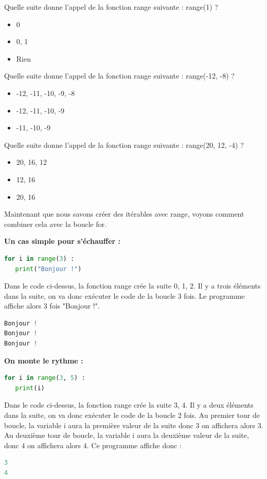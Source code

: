\begin{Quizz}
    Quelle suite donne l'appel de la fonction range suivante : range(1) ?
    \begin{itemize}
        \renewcommand{\labelitemi}{$\square$}
        \item 0
        \item 0, 1
        \item Rien
    \end{itemize}
\end{Quizz}
\begin{Quizz}
    Quelle suite donne l'appel de la fonction range suivante : range(-12, -8) ?
    \begin{itemize}
        \renewcommand{\labelitemi}{$\square$}
        \item -12, -11, -10, -9, -8
        \item -12, -11, -10, -9
        \item -11, -10, -9
    \end{itemize}
    Quelle suite donne l'appel de la fonction range suivante : range(20, 12, -4) ?
    \begin{itemize}
        \renewcommand{\labelitemi}{$\square$}
        \item 20, 16, 12
        \item 12, 16
        \item 20, 16
    \end{itemize}
\end{Quizz}


Maintenant que nous savons créer des itérables avec range, voyons comment combiner cela avec la boucle for.

\begin{center}{\textbf{\large Un cas simple pour s'échauffer :}}\end{center}
\begin{lstlisting}[style=pythonstyle, language=python]
for i in range(3) :
   print("Bonjour !")
\end{lstlisting}
Dans le code ci-dessus, la fonction range crée la suite 0, 1, 2. Il y a trois éléments dans la suite, on va donc exécuter le code de la boucle 3 fois. Le programme affiche alors 3 fois "Bonjour !". 
\begin{lstlisting}[style=pythonstyle, language=python]
Bonjour !
Bonjour !
Bonjour !
\end{lstlisting}

\begin{center}{\textbf{\large On monte le rythme :}}\end{center}
\begin{lstlisting}[style=pythonstyle, language=python]
for i in range(3, 5) :
   print(i)
\end{lstlisting}
Dans le code ci-dessus, la fonction range crée la suite 3, 4. Il y a deux éléments dans la suite, on va donc exécuter le code de la boucle 2 fois. Au premier tour de boucle, la variable i aura la première valeur de la suite donc 3 on affichera alors 3. Au deuxième tour de boucle, la variable i aura la deuxième valeur de la suite, donc 4 on affichera alors 4. Ce programme affiche donc :
\begin{lstlisting}[style=pythonstyle, language=python]
3
4
\end{lstlisting}

